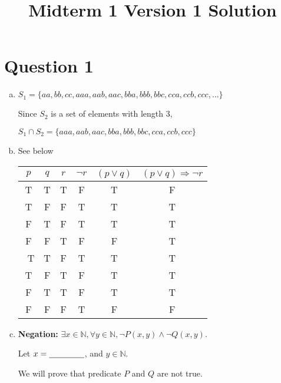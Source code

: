 \documentclass[12pt]{article}
\begin{document}
\title{Midterm 1 Version 1 Solution}
\maketitle

\section*{Question 1}
\begin{enumerate}[a.]
    \item

    $S_1 = \{aa,bb,cc,aaa,aab,aac,bba,bbb,bbc,cca,ccb,ccc,\dots\}$

    \bigskip

    Since $S_2$ is a set of elements with length 3,

    $S_1 \cap S_2 = \{aaa,aab,aac,bba,bbb,bbc,cca,ccb,ccc\}$

    \item

    See below

    \begin{tabular}{c|c|c|c|c|c}
        $p$ & $q$ & $r$ & $\neg r$ & $(p \lor q)$ & $(p \lor q) \Rightarrow \neg r$\\
        \hline
        T & T & T & F & T & F\\
        \hline
        T & F & F & T & T & T\\
        \hline
        F & T & F & T & T & T\\
        \hline
        F & F & T & F & F & T\\
        \
        T & T & F & T & T & T\\
        \hline
        T & F & T & F & T & T\\
        \hline
        F & T & T & F & T & T\\
        \hline
        F & F & F & T & F & F
    \end{tabular}

    \item

    \textbf{Negation:} $\exists x \in \mathbb{N}, \forall y \in \mathbb{N}, \neg
    P(x,y) \land \neg Q(x,y)$.

    \bigskip

    Let $x = \underline{\hspace{1.5cm}}$, and $y \in \mathbb{N}$.

    \bigskip

    We will prove that predicate $P$ and $Q$ are not true.

\end{enumerate}
\end{document}
